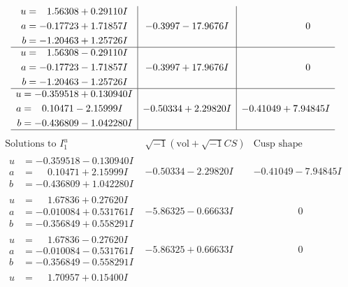 \documentclass[1p]{elsarticle_modified}
\theoremstyle{definition}
\newcommand{\I}{\sqrt{-1}}
\begin{document}
$$\begin{array}{c|c|c}
\begin{aligned}
u &= \phantom{-}1.56308 + 0.29110 I \\
a &= -0.17723 + 1.71857 I \\
b &= -1.20463 + 1.25726 I\end{aligned}
 & -0.3997 - 17.9676 I & \phantom{-0.000000 } 0 \\ \hline\begin{aligned}
u &= \phantom{-}1.56308 - 0.29110 I \\
a &= -0.17723 - 1.71857 I \\
b &= -1.20463 - 1.25726 I\end{aligned}
 & -0.3997 + 17.9676 I & \phantom{-0.000000 } 0 \\ \hline\begin{aligned}
u &= -0.359518 + 0.130940 I \\
a &= \phantom{-}0.10471 - 2.15999 I \\
b &= -0.436809 - 1.042280 I\end{aligned}
 & -0.50334 + 2.29820 I & -0.41049 + 7.94845 I\\
 \hline 
 \end{array}$$\newpage$$\begin{array}{c|c|c}  
\text{Solutions to }I^u_{1}& \I (\text{vol} + \sqrt{-1}CS) & \text{Cusp shape}\\
 \hline 
\begin{aligned}
u &= -0.359518 - 0.130940 I \\
a &= \phantom{-}0.10471 + 2.15999 I \\
b &= -0.436809 + 1.042280 I\end{aligned}
 & -0.50334 - 2.29820 I & -0.41049 - 7.94845 I \\ \hline\begin{aligned}
u &= \phantom{-}1.67836 + 0.27620 I \\
a &= -0.010084 + 0.531761 I \\
b &= -0.356849 + 0.558291 I\end{aligned}
 & -5.86325 - 0.66633 I & \phantom{-0.000000 } 0 \\ \hline\begin{aligned}
u &= \phantom{-}1.67836 - 0.27620 I \\
a &= -0.010084 - 0.531761 I \\
b &= -0.356849 - 0.558291 I\end{aligned}
 & -5.86325 + 0.66633 I & \phantom{-0.000000 } 0 \\ \hline\begin{aligned}
u &= \phantom{-}1.70957 + 0.15400 I \\

\end{aligned}
\end{array}$$
\end{document}
